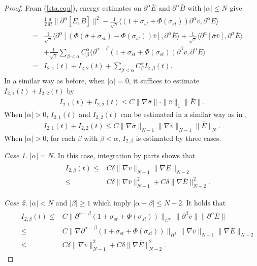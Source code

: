 \documentclass[11pt]{amsart}
\numberwithin{equation}{section}
\begin{document}
\begin{proof}
From (\ref{sta.equ}), energy estimates on $\partial^{\alpha}\bar{E}$
and $\partial^{\alpha}\bar{B}$ with $|\alpha| \leq N$ give
\begin{eqnarray}\label{3.5}
 && \begin{aligned}
   &\frac{1}{2}\frac{d}{dt}\|\partial^{\alpha}[\bar{E},\bar{B}]\|^{2}
-\frac{1}{\sqrt{\gamma}}\langle
(1+\sigma_{st}+\Phi(\sigma_{st}))\partial
   ^{\alpha}\bar{v},\partial^{\alpha}\bar{E}\rangle\\
   =&\frac{1}{\sqrt{\gamma}}\langle \partial
   ^{\alpha}[(\Phi(\bar{\sigma}+\sigma_{st})-\Phi(\sigma_{st}))\bar{v}],\partial^{\alpha}\bar{E}\rangle+
   \frac{1}{\sqrt{\gamma}}\langle \partial
   ^{\alpha}[\bar{\sigma}\bar{v}],\partial^{\alpha}\bar{E}\rangle\\
   &+\frac{1}{\sqrt{\gamma}}\sum_{\beta<\alpha}C_{\beta}^{\alpha}\langle \partial^{\alpha-\beta}(1+\sigma_{st}+\Phi(\sigma_{st}))
   \partial^{\beta}\bar{v},\partial^{\alpha}\bar{E}\rangle\\
   =&I_{2,1}(t)+I_{2,2}(t)+\sum_{\beta<\alpha}C_{\beta}^{\alpha}I_{2,\beta}(t).
 \end{aligned}
\end{eqnarray}
In a similar way as before,  when $|\alpha|=0$, it suffices to
estimate $I_{2,1}(t)+ I_{2,2}(t)$ by
\begin{eqnarray*}
  I_{2,1}(t)+ I_{2,2}(t)\leq C \|\nabla
  \bar{\sigma}\|\cdot\|\bar{v}\|_{1}\|\bar{E}\|.
\end{eqnarray*}
When $|\alpha|>0$, $I_{2,1}(t)$ and $I_{2,2}(t)$ can be estimated in
a similar way as in \cite{Duan},
\begin{eqnarray*}
  I_{2,1}(t)+ I_{2,2}(t)\leq C \|\nabla \bar{\sigma}\|_{N-1}\|\nabla \bar{v}\|_{N-1}\|\bar{E}\|_{N}.
\end{eqnarray*}
When $|\alpha|>0$, for each $\beta$ with $\beta<\alpha$,
$I_{2,\beta}$ is estimated by three cases.

\textsl{Case 1.} $|\alpha|=N$. In this case, integration by parts
shows that
\begin{eqnarray*}
 && \begin{aligned}
  I_{2,\beta}(t) \leq & C \delta \|\nabla \bar{v}\|_{N-1}\|\nabla\bar{E}\|_{N-2}\\
  \leq &  C \delta \|\nabla \bar{v}\|_{N-1}^2+C \delta \|\nabla \bar{E}\|_{N-2}^2.
\end{aligned}
\end{eqnarray*}

\textsl{Case 2.} $|\alpha|<N $ and $|\beta|\geq 1$ which imply
$|\alpha-\beta|\leq N-2$. It holds that
\begin{eqnarray*}
 && \begin{aligned}
  I_{2,\beta}(t) \leq &  C\|\partial^{\alpha-\beta}(1+\sigma_{st}+\Phi(\sigma_{st}))\|_{L^{\infty}}
\|\partial^{\beta}\bar{v}\|\|\partial^{\alpha}\bar{E}\|\\
\leq & C\|\nabla\partial^{\alpha-\beta}(1+\sigma_{st}+\Phi(\sigma_{st}))\|_{H^{1}}\|\nabla \bar{v}\|_{N-1}\|\nabla\bar{E}\|_{N-2}\\
  \leq &  C \delta \|\nabla \bar{v}\|_{N-1}^2+C \delta \|\nabla
  \bar{E}\|_{N-2}^2.
\end{aligned}
\end{eqnarray*}


\end{proof}
\end{document}
